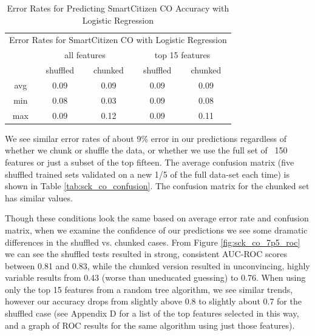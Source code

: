 \begin{table}[]
\centering
\begin{tabular}{|c|c|c|c|c|}
\toprule
\multicolumn{5}{|c|}{Error Rates for SmartCitizen CO with Logistic Regression} \\
&\multicolumn{2}{|c|}{all features} & \multicolumn{2}{|c|}{top 15 features} \\
&shuffled & chunked & shuffled & chunked \\
avg & 0.09 & 0.09 & 0.09 & 0.09 \\
min & 0.08 & 0.03 & 0.09 & 0.08 \\
max & 0.09 & 0.12 & 0.09 & 0.11 \\
\bottomrule
\end{tabular}
\label{tab:sck_co_error_rates}
\caption{Error Rates for Predicting SmartCitizen CO Accuracy with Logistic Regression}
\end{table}

We see similar error rates of about 9\% error in our predictions regardless of whether we chunk or shuffle the data, or whether we use the full set of ~150 features or just a subset of the top fifteen.  The average confusion matrix (five shuffled trained sets validated on a new 1/5 of the full data-set each time) is shown in Table \ref{tab:sck_co_confusion}.  The confusion matrix for the chunked set has similar values.

\begin{margintable}[]
\centering
\offinterlineskip
\hspace*{-5cm}\raisebox{-4cm}[0pt][0pt]{}\par
\hspace{.3cm}\par
\vspace{-.5cm}
\hspace*{1cm}\par
{}
\vspace{-.35cm}\raisebox{-1cm}
}
\label{tab:sck_co_confusion}
\caption{Average SmartCitizen CO Confusion Matrix w/Shuffled K-Fold}
\end{margintable}

Though these conditions look the same based on average error rate and confusion matrix, when we examine the confidence of our predictions we see some dramatic differences in the shuffled vs. chunked cases.  From Figure \ref{fig:sck_co_7p5_roc} we can see the shuffled tests resulted in strong, consistent AUC-ROC scores between 0.81 and 0.83, while the chunked version resulted in unconvincing, highly variable results from 0.43 (worse than uneducated guessing) to 0.76.  When using only the top 15 features from a random tree algorithm, we see similar trends, however our accuracy drops from slightly above 0.8 to slightly about 0.7 for the shuffled case (see Appendix D for a list of the top features selected in this way, and a graph of ROC results for the same algorithm using just those features).   

